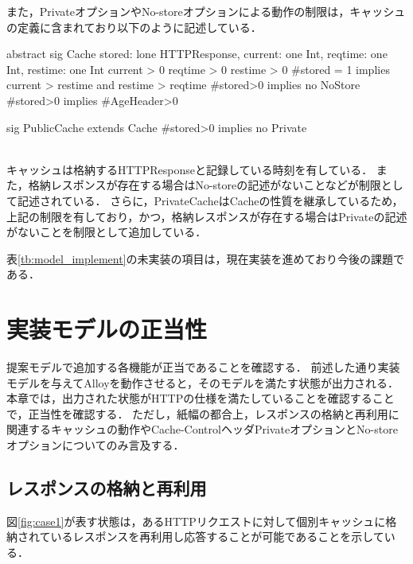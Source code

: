 \documentclass{css}
\begin{document}
また，PrivateオプションやNo-storeオプションによる動作の制限は，キャッシュの定義に含まれており以下のように記述している．\\\hrulefill
\begin{small}
\begin{verbatimtab}[4]
abstract sig Cache{
	stored: lone HTTPResponse,
	current: one Int,
	reqtime: one Int,
	restime: one Int
}{
	current > 0
	reqtime > 0
	restime > 0
	#stored  = 1 implies
		current > restime and restime > reqtime
	#stored>0 implies no NoStore
	#stored>0 implies #AgeHeader>0
}

sig PublicCache extends Cache{}{
	#stored>0 implies no Private
}
\end{verbatimtab}
\end{small}
\hrulefill\\
キャッシュは格納するHTTPResponseと記録している時刻を有している．
また，格納レスポンスが存在する場合はNo-storeの記述がないことなどが制限として記述されている．
さらに，PrivateCacheはCacheの性質を継承しているため，上記の制限を有しており，かつ，格納レスポンスが存在する場合はPrivateの記述がないことを制限として追加している．

表\ref{tb:model_implement}の未実装の項目は，現在実装を進めており今後の課題である．

\section{実装モデルの正当性}
\label{sec:correctness}
提案モデルで追加する各機能が正当であることを確認する．
前述した通り実装モデルを与えてAlloyを動作させると，そのモデルを満たす状態が出力される．
本章では，出力された状態がHTTPの仕様を満たしていることを確認することで，正当性を確認する．
ただし，紙幅の都合上，レスポンスの格納と再利用に関連するキャッシュの動作やCache-ControlヘッダPrivateオプションとNo-storeオプションについてのみ言及する．

\subsection{レスポンスの格納と再利用}
図\ref{fig:case1}が表す状態は，あるHTTPリクエストに対して個別キャッシュに格納されているレスポンスを再利用し応答することが可能であることを示している．
\end{document}
